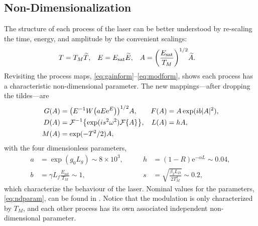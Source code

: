 \documentclass[9pt,twocolumn,twoside]{osajnl}
\let\originalleft\left
\let\originalright\right
\renewcommand{\left}{\mathopen{}\mathclose\bgroup\originalleft}
\renewcommand{\right}{\aftergroup\egroup\originalright}
\newcommand{\Es}{E_{\textrm{sat}}} %
\newcommand{\FT}[1]{\mathcal{F}\left\{ #1 \right\}} %
\newcommand{\FTi}[1]{\mathcal{F}^{-1}\left\{ #1 \right\}} %
\begin{document}
\subsection{Non-Dimensionalization}
The structure of each process of the laser can be better understood by re-scaling the time, energy, and amplitude by the convenient scalings:
\begin{align}
	T &= T_M \widetilde{T},& E &= \Es \widetilde{E},& A &= \left( \frac{\Es}{T_M} \right)^{1/2} \widetilde{A}.
\end{align}
Revisiting the process maps, \eqref{eq:gainform}--\eqref{eq:modform}, shows each process has a characteristic non-dimensional parameter. The new mappings---after dropping the tildes---are
\begin{equation}
	\begin{aligned}
		G(A) &= \left(E^{-1} W \left( a E \textrm{e}^{E}\right) \right)^{1/2} A, & F(A) &= A \exp( i b |A|^2), \\
		D(A) &= \FTi{\exp( i s^2 \omega^2 ) \FT{A}}, & L(A) &= h A, \\
		M(A) &= \exp( -T^2 / 2 ) A,
		\label{eq:effects}
	\end{aligned}
\end{equation}
with the four dimensionless parameters,
\begin{equation}
	\begin{aligned}
		a &= \exp( g_0 L_g ) \sim 8 \times 10^3,& \qquad h &= (1 - R) \textrm{e}^{-\alpha L} \sim 0.04, \\
		b &= \gamma L_f \frac{\Es}{T_M} \sim 1,& \qquad s &= \sqrt{\frac{\beta_2 L_D}{2 T_M^2}} \sim 0.2,
		\label{eq:ndparam}
	\end{aligned}
\end{equation}
which characterize the behaviour of the laser. Nominal values for the parameters, \eqref{eq:ndparam}, can be found in \cite{agrawal2002, agrawal2013, bohun2015, burgoyne2014, burgoyneemail, finot2008, li1998, litchinitser1997, peng2018, shtyrina2017, tamura1993, tamura1996, tomlinson1984, usechak2005, yamashita2009, yarutkina2013}. Notice that the modulation is only characterized by $T_M$, and each other process has its own associated independent non-dimensional parameter.
\end{document}
